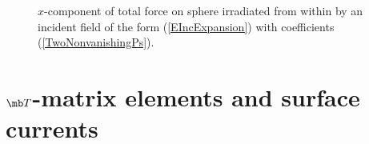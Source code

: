 \documentclass[letterpaper]{article}
\begin{document}
\begin{figure}[H]
\begin{center}
\caption{$x$-component of total force on sphere irradiated from 
         within by an incident field of the form (\ref{EIncExpansion}) 
         with coefficients (\ref{TwoNonvanishingPs}).
        }
\label{TotalForce}
\end{center}
\end{figure}

\newpage
\section{$\mb T$-matrix elements and surface currents}
\end{document}
